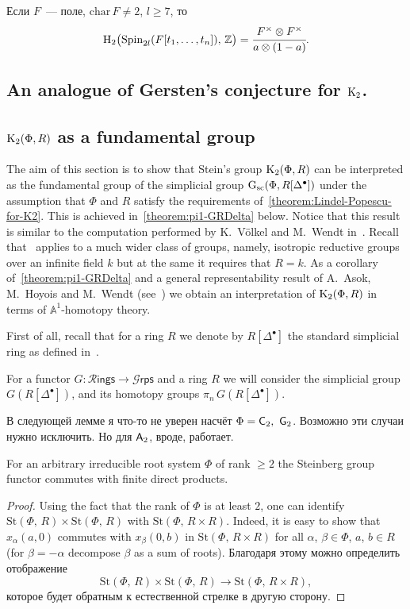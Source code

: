\documentclass[oneside, 11pt]{amsart}
\begin{document}
\begin{corollary}
Если $F$~--- поле, $\mathrm{char}\,F\neq2$, $l\geq7$, то
$$
\mathrm H_2\big(\mathrm{Spin}_{2l}(F[t_1,\ldots,t_n]),\,\mathbb Z\big)=\cfrac{F^\times\otimes F^\times}{a\otimes(1-a)}.
$$
\end{corollary}
\subsection{An analogue of Gersten's conjecture for ${\mathrm{K}}_2$.}

\subsection{${\mathrm{K}}_2(\Phi, R)$ as a fundamental group}
The aim of this section is to show that Stein's group ${\mathrm{K}}_2(\Phi, R)$ can be interpreted as the fundamental group of the simplicial group $\mathrm{G}_\mathrm{sc}(\Phi, R[\Delta^\bullet])$ under the assumption that $\Phi$ and $R$ satisfy the requirements of~\cref{theorem:Lindel-Popescu-for-K2}. This is achieved in~\cref{theorem:pi1-GRDelta} below. Notice that this result is similar to the computation performed by K.~V\"olkel and M.~Wendt in~\cite[\S.~3]{VW16}. Recall that~\cite[Proposition~3.2]{VW16} applies to a much wider class of groups, namely, isotropic reductive groups over an infinite field $k$ but at the same it requires that $R=k$. As a corollary of~\cref{theorem:pi1-GRDelta} and a general representability result of A.~Asok, M.~Hoyois and M.~Wendt (see~\cite[Theorem~4.3.1]{AHW18}) we obtain an interpretation of ${\mathrm{K}}_2(\Phi, R)$ in terms of $\mathbb{A}^1$-homotopy theory.

First of all, recall that for a ring $R$ we denote by $R[\Delta^\bullet]$ the standard simplicial ring as defined in~\cite{Jar83}. 

For a functor $G\colon\mathcal R\mathsf{ings}\rightarrow\mathcal G\mathsf{rps}$ and a ring $R$ we will consider the simplicial group $G(R[\Delta^\bullet])$, and its homotopy groups $\pi_n\,G(R[\Delta^\bullet])$. 

В следующей лемме я что-то не уверен насчёт $\Phi=\mathsf{C}_2,\ \mathsf{G}_2$. Возможно эти случаи нужно исключить. Но для $\mathsf{A}_2$, вроде, работает.

\begin{lemma} \label{lem:fprod} For an arbitrary irreducible root system $\Phi$ of rank $\geq 2$ the Steinberg group functor commutes with finite direct products. \end{lemma}
\begin{proof} Using the fact that the rank of $\Phi$ is at least $2$, one can identify $\mathrm{St}(\Phi,\,R)\times\mathrm{St}(\Phi,\,R)$ with $\mathrm{St}(\Phi,\,R\times R)$. Indeed, it is easy to show that $x_{\alpha}(a,0)$ commutes with $x_\beta(0,b)$ in $\mathrm{St}(\Phi,\,R\times R)$ for all $\alpha$, $\beta\in\Phi$, $a$, $b\in R$ (for $\beta=-\alpha$ decompose $\beta$ as a sum of roots). Благодаря этому можно определить отображение $$\mathrm{St}(\Phi,\,R)\times\mathrm{St}(\Phi,\,R)\rightarrow\mathrm{St}(\Phi,\,R\times R),$$ которое будет обратным к естественной стрелке в другую сторону. \end{proof}
\end{document}
